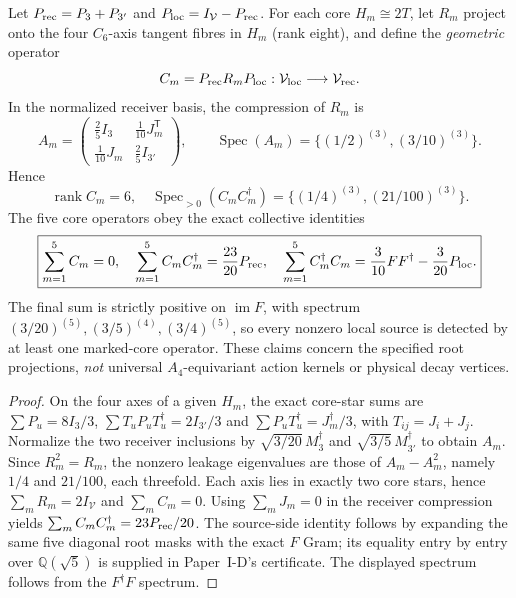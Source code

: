 \documentclass[11pt]{article}
\begin{document}
\begin{theorem}
\label{p1:thm:v371-petersen-rooted-leakage}
Let $P_{\rm rec}=P_3+P_{3'}$ and
$P_{\rm loc}=I_{\mathcal V}-P_{\rm rec}$. For each core $H_m\cong2T$,
let $R_m$ project onto the four $C_6$-axis tangent fibres in $H_m$
(rank eight), and define the \emph{geometric} operator
\[
 C_m=P_{\rm rec}R_mP_{\rm loc}:
 \mathcal V_{\rm loc}\longrightarrow\mathcal V_{\rm rec}.
\]
In the normalized receiver basis, the compression of $R_m$ is
\[
 A_m=\begin{pmatrix}
 \tfrac25I_3&\tfrac1{10}J_m^{\mathsf T}\\
 \tfrac1{10}J_m&\tfrac25I_{3'}
 \end{pmatrix},\qquad
 \operatorname{Spec}(A_m)=\{(1/2)^{(3)},(3/10)^{(3)}\}.
\]
Hence
\[
 \boxed{\operatorname{rank}C_m=6,\quad
 \operatorname{Spec}_{>0}(C_mC_m^\dagger)
 =\{(1/4)^{(3)},(21/100)^{(3)}\}.}
\]
The five core operators obey the exact collective identities
\[
 \boxed{\sum_{m=1}^5C_m=0,\quad
 \sum_{m=1}^5C_mC_m^\dagger={23\over20}P_{\rm rec},\quad
 \sum_{m=1}^5C_m^\dagger C_m
 ={3\over10}FF^\dagger-{3\over20}P_{\rm loc}.}
\]
The final sum is strictly positive on $\operatorname{im}F$, with
spectrum $(3/20)^{(5)},(3/5)^{(4)},(3/4)^{(5)}$, so every nonzero
local source is detected by at least one marked-core operator.
These claims concern the specified root projections, \emph{not}
universal $A_4$-equivariant action kernels or physical decay vertices.
\end{theorem}
\begin{proof}
On the four axes of a given $H_m$, the exact core-star sums are
$\sum P_u=8I_3/3$, $\sum T_uP_uT_u^\dagger=2I_{3'}/3$ and
$\sum P_uT_u^\dagger=J_m^\dagger/3$, with $T_{ij}=J_i+J_j$.
Normalize the two receiver inclusions by
$\sqrt{3/20}\,M_3^\dagger$ and
$\sqrt{3/5}\,M_{3'}^\dagger$ to obtain $A_m$.
Since $R_m^2=R_m$, the nonzero leakage eigenvalues are those of
$A_m-A_m^2$, namely $1/4$ and $21/100$, each threefold.
Each axis lies in exactly two core stars, hence
$\sum_mR_m=2I_{\mathcal V}$ and $\sum_mC_m=0$.
Using $\sum_mJ_m=0$ in the receiver compression yields
$\sum_mC_mC_m^\dagger=23P_{\rm rec}/20$.
The source-side identity follows by expanding the same five diagonal
root masks with the exact $F$ Gram; its equality entry by entry over
$\mathbb Q(\sqrt5)$ is supplied in Paper~I-D's certificate.
The displayed spectrum follows from the $F^\dagger F$ spectrum.
\end{proof}
\end{document}
